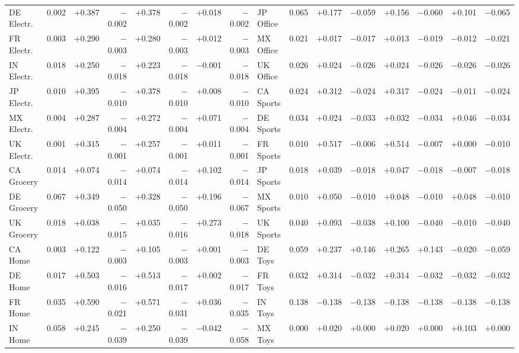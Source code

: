 \begin{table}[H]
\begin{tabular}{lrrrrrrr@{\hspace{10pt}}lrrrrrrr}
DE Electr. & 0.002 & +0.387 & $-$0.002 & +0.378 & $-$0.002 & +0.018 & $-$0.002 & JP Office & 0.065 & +0.177 & $-$0.059 & +0.156 & $-$0.060 & +0.101 & $-$0.065 \\
FR Electr. & 0.003 & +0.290 & $-$0.003 & +0.280 & $-$0.003 & +0.012 & $-$0.003 & MX Office & 0.021 & +0.017 & $-$0.017 & +0.013 & $-$0.019 & $-$0.012 & $-$0.021 \\
IN Electr. & 0.018 & +0.250 & $-$0.018 & +0.223 & $-$0.018 & $-$0.001 & $-$0.018 & UK Office & 0.026 & +0.024 & $-$0.026 & +0.024 & $-$0.026 & $-$0.026 & $-$0.026 \\
JP Electr. & 0.010 & +0.395 & $-$0.010 & +0.378 & $-$0.010 & +0.008 & $-$0.010 & CA Sports & 0.024 & +0.312 & $-$0.024 & +0.317 & $-$0.024 & $-$0.011 & $-$0.024 \\
MX Electr. & 0.004 & +0.287 & $-$0.004 & +0.272 & $-$0.004 & +0.071 & $-$0.004 & DE Sports & 0.034 & +0.024 & $-$0.033 & +0.032 & $-$0.034 & +0.046 & $-$0.034 \\
UK Electr. & 0.001 & +0.315 & $-$0.001 & +0.257 & $-$0.001 & +0.011 & $-$0.001 & FR Sports & 0.010 & +0.517 & $-$0.006 & +0.514 & $-$0.007 & +0.000 & $-$0.010 \\
CA Grocery & 0.014 & +0.074 & $-$0.014 & +0.074 & $-$0.014 & +0.102 & $-$0.014 & JP Sports & 0.018 & +0.039 & $-$0.018 & +0.047 & $-$0.018 & $-$0.007 & $-$0.018 \\
DE Grocery & 0.067 & +0.349 & $-$0.050 & +0.328 & $-$0.050 & +0.196 & $-$0.067 & MX Sports & 0.010 & +0.050 & $-$0.010 & +0.048 & $-$0.010 & +0.048 & $-$0.010 \\
UK Grocery & 0.018 & +0.038 & $-$0.015 & +0.035 & $-$0.016 & +0.273 & $-$0.018 & UK Sports & 0.040 & +0.093 & $-$0.038 & +0.100 & $-$0.040 & $-$0.010 & $-$0.040 \\
CA Home & 0.003 & +0.122 & $-$0.003 & +0.105 & $-$0.003 & +0.001 & $-$0.003 & DE Toys & 0.059 & +0.237 & +0.146 & +0.265 & +0.143 & $-$0.020 & $-$0.059 \\
DE Home & 0.017 & +0.503 & $-$0.016 & +0.513 & $-$0.017 & +0.002 & $-$0.017 & FR Toys & 0.032 & +0.314 & $-$0.032 & +0.314 & $-$0.032 & $-$0.032 & $-$0.032 \\
FR Home & 0.035 & +0.590 & $-$0.021 & +0.571 & $-$0.031 & +0.036 & $-$0.035 & IN Toys & 0.138 & $-$0.138 & $-$0.138 & $-$0.138 & $-$0.138 & $-$0.138 & $-$0.138 \\
IN Home & 0.058 & +0.245 & $-$0.039 & +0.250 & $-$0.039 & $-$0.042 & $-$0.058 & MX Toys & 0.000 & +0.020 & +0.000 & +0.020 & +0.000 & +0.103 & +0.000 \\

\end{tabular}
\end{table}
